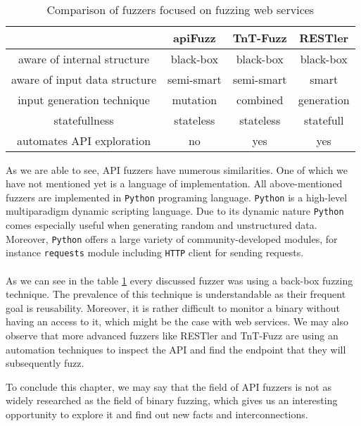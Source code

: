 \paragraph{}
\begin{table}[h]
\begin{center}
\begin{tabular}{|c|c c c|}
\hline
                              & apiFuzz    & TnT-Fuzz   & RESTler    \\
\hline
aware of internal structure   & black-box  & black-box  & black-box  \\
aware of input data structure & semi-smart & semi-smart & smart      \\
input generation technique    & mutation   & combined   & generation \\
statefullness                 & stateless  & stateless  & statefull  \\
automates API exploration     & no         & yes        & yes        \\
\hline
\end{tabular}
\caption{Comparison of fuzzers focused on fuzzing web services}
\label{table:fuzzers-comparison}
\end{center}
\end{table}

As we are able to see, API fuzzers have numerous similarities. One of which we have not mentioned yet is a language of implementation. All above-mentioned fuzzers are implemented in \texttt{Python} programing language. \texttt{Python} is a high-level multiparadigm dynamic scripting language. Due to its dynamic nature \texttt{Python} comes especially useful when generating random and unstructured data. Moreover, \texttt{Python} offers a large variety of community-developed modules, for instance \texttt{requests} module including \texttt{HTTP} client for sending requests.

\paragraph{}
As we can see in the table \ref{table:fuzzers-comparison} every discussed fuzzer was using a back-box fuzzing technique. The prevalence of this technique is understandable as their frequent goal is reusability. Moreover, it is rather difficult to monitor a binary without having an access to it, which might be the case with web services. We may also observe that more advanced fuzzers like RESTler and TnT-Fuzz are using an automation techniques to inspect the API and find the endpoint that they will subsequently fuzz.

To conclude this chapter, we may say that the field of API fuzzers is not as widely researched as the field of binary fuzzing, which gives us an interesting opportunity to explore it and find out new facts and interconnections.
